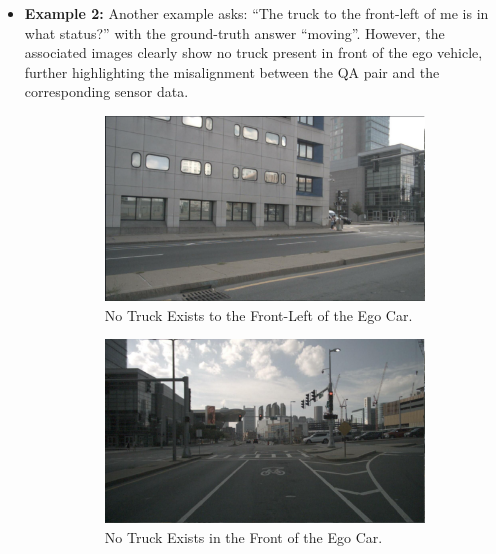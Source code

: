 \documentclass{article} %
\begin{document}
\begin{itemize}
    \item \textbf{Example 2:} Another example asks: “The truck to the front-left of me is in what status?” with the ground-truth answer “moving”. However, the associated images clearly show no truck present in front of the ego vehicle, further highlighting the misalignment between the QA pair and the corresponding sensor data.
\begin{figure}[H]
    \centering
    \begin{subfigure}[t]{0.3\textwidth}
        \includegraphics[width=\linewidth]{Figures/exam2_front_left_truck.png}
        \caption{\small No Truck Exists to the Front-Left of the Ego Car.}
    \end{subfigure}
    \hfill
    \begin{subfigure}[t]{0.3\textwidth}
        \includegraphics[width=\linewidth]{Figures/exam2_front_truck.png}
        \caption{\small No Truck Exists in the Front of the Ego Car.}
    \end{subfigure}
    \hfill
    \begin{subfigure}[t]{0.3\textwidth}

\end{subfigure}
\end{figure}
\end{itemize}
\end{document}
